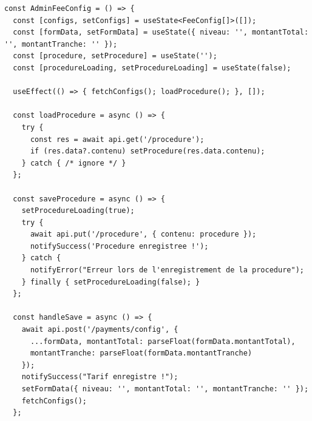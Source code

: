 \documentclass[12pt,a4paper]{article}
\begin{document}
\begin{lstlisting}[style=code]
const AdminFeeConfig = () => {
  const [configs, setConfigs] = useState<FeeConfig[]>([]);
  const [formData, setFormData] = useState({ niveau: '', montantTotal: '', montantTranche: '' });
  const [procedure, setProcedure] = useState('');
  const [procedureLoading, setProcedureLoading] = useState(false);

  useEffect(() => { fetchConfigs(); loadProcedure(); }, []);

  const loadProcedure = async () => {
    try {
      const res = await api.get('/procedure');
      if (res.data?.contenu) setProcedure(res.data.contenu);
    } catch { /* ignore */ }
  };

  const saveProcedure = async () => {
    setProcedureLoading(true);
    try {
      await api.put('/procedure', { contenu: procedure });
      notifySuccess('Procedure enregistree !');
    } catch {
      notifyError("Erreur lors de l'enregistrement de la procedure");
    } finally { setProcedureLoading(false); }
  };

  const handleSave = async () => {
    await api.post('/payments/config', {
      ...formData, montantTotal: parseFloat(formData.montantTotal),
      montantTranche: parseFloat(formData.montantTranche)
    });
    notifySuccess("Tarif enregistre !");
    setFormData({ niveau: '', montantTotal: '', montantTranche: '' });
    fetchConfigs();
  };


\end{lstlisting}
\end{document}
